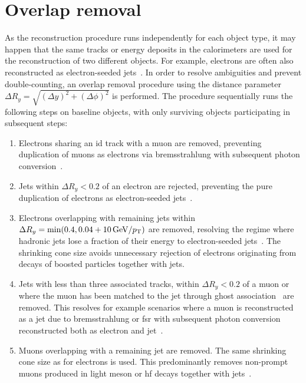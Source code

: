 \section{Overlap removal}\label{sec:overlap_removal}

As the reconstruction procedure runs independently for each object type, it may happen that the same tracks or energy deposits in the calorimeters are used for the reconstruction of two different objects. For example, electrons are often also reconstructed as electron-seeded jets~\cite{overlapremoval:1700874}. In order to resolve ambiguities and prevent double-counting, an overlap removal procedure using the distance parameter $\Delta R_y = \sqrt{(\Delta y)^2+(\Delta \phi)^2}$ is performed. The procedure sequentially runs the following steps on baseline objects, with only surviving objects participating in subsequent steps:
\begin{enumerate}
	\item Electrons sharing an \gls{id} track with a muon are removed, preventing duplication of muons as electrons via bremsstrahlung with subsequent photon conversion~\cite{overlapremoval:1700874}.
	\item Jets within $\Delta R_y < 0.2$ of an electron are rejected, preventing the pure duplication of electrons as electron-seeded jets~\cite{overlapremoval:1700874}.
	\item Electrons overlapping with remaining jets within $\Delta R_y = \min (0.4, 0.04+\SI{10}{\GeV}/\pt)$ are removed, resolving the regime where hadronic jets lose a fraction of their energy to electron-seeded jets~\cite{overlapremoval:1700874}. The shrinking cone size avoids unnecessary rejection of electrons originating from decays of boosted particles together with jets.
	\item Jets with less than three associated tracks, within $\Delta R_y < 0.2$ of a muon or where the muon has been matched to the jet through ghost association~\cite{ghostassociation:2008gn} are removed. This resolves for example scenarios where a muon is reconstructed as a jet due to bremsstrahlung or \gls{fsr} with subsequent photon conversion reconstructed both as electron and jet~\cite{overlapremoval:1700874}.
	\item Muons overlapping with a remaining jet are removed. The same shrinking cone size as for electrons is used. This predominantly removes non-prompt muons produced in light meson or \gls{hf} decays together with jets~\cite{overlapremoval:1700874}. 
\end{enumerate} 


